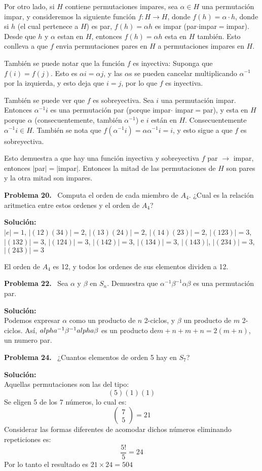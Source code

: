 \documentclass{article}
\newcounter{problem}
\newcounter{solution}
\newcommand\Problem[1]{%
  \stepcounter{problem}%
  \textbf{Problema #1.}~%
  \setcounter{solution}{0}%
}
\newcommand\TheSolution{%
  \textbf{Solución:}\\%
}
\begin{document}
Por otro lado, si $H$ contiene permutaciones impares, sea $\alpha \in H$ una
permutación impar, y consideremos la siguiente función $f: H \rightarrow
H$, donde $f(h) = \alpha \cdot h$, donde si $h$ (el cual pertenece a $H$) es
par, $f(h) = \alpha h$ es impar (par$\cdot$impar$=$impar). Desde que $h$ y
$\alpha$ estan en $H$, entonces $f(h)=\alpha h$ esta en $H$ también. Esto
conlleva a que $f$ envia permutaciones pares en $H$ a permutaciones impares
en $H$.

Tambi\'en se puede notar que la funci\'on $f$ es inyectiva: Suponga que
$f(i) = f(j)$. Esto es $\alpha i = \alpha j$, y las $\alpha$s se pueden
cancelar multiplicando $\alpha^{-1}$ por la izquierda, y esto deja que $i=j$,
por lo que $f$ es inyectiva.

También se puede ver que $f$ es sobreyectiva. Sea $i$ una permutación
impar. Entonces $\alpha^{-1}i$ es una permutación par (porque impar$\cdot$
impar$=$par), y esta en $H$ porque $\alpha$ (consecuentemente, también $\alpha
^{-1}$) e $i$ están en $H$. Consecuentemente $\alpha^{-1}i \in H$. También
se nota que $f(\alpha^{-1}i) = \alpha\alpha^{-1}i = i$, y esto sigue a que $f$
es sobreyectiva.

Esto demuestra a que hay una función inyectiva y sobreyectiva $f$ par
$\rightarrow $ impar, entonces $|$par$|=|$impar$|$. Entonces la mitad de las
permutaciones de $H$ son pares y la otra mitad son impares.

\Problem{20} Computa el orden de cada miembro de $A_4$. ¿Cual es la relación
aritmetica entre estos ordenes y el orden de $A_4$?

\TheSolution{}
$|e| = 1$, $|(12)(34)| = 2$, $|(13)(24)| = 2$, $|(14)(23)| = 2$, $|(123)| = 
3$, $|(132)| = 3$, $|(124)| = 3$, $|(142)| = 3$, $|(134)| = 3$, $|(143)|$,
$|(234)| = 3$, $|(243)| = 3$

El orden de $A_4$ es 12, y todos los ordenes de sus elementos dividen a 12.

\Problem{22} Sea $\alpha$ y $\beta$ en $S_n$. Demuestra que $\alpha^{-1}\beta
^{-1}\alpha\beta$ es una permutación par.

\TheSolution{} Podemos expresar $\alpha$ como un producto de $n$ 2-ciclos, y
$\beta$ un producto de $m$ 2-ciclos. Así, $\\alpha^{-1}\beta^{-1}alpha\beta$
es un producto de$m + n + m + n = 2(m + n)$, un numero par.

\Problem{24} ¿Cuantos elementos de orden 5 hay en $S_7$?

\TheSolution{}
Aquellas permutaciones son las del tipo:
\[
  (5)(1)(1)	
\]
Se eligen 5 de los 7 n\'umeros, lo cual es:
\[
  \left(
    \begin{array}{c}
      7 \\
      5
    \end{array}
  \right)
  = 21
\]
Considerar las formas diferentes de acomodar dichos n\'umeros eliminando repeticiones es:
\[
  \frac{5!}{5} = 24	
\]
Por lo tanto el resultado es $21 \times 24 = 504$
\end{document}
